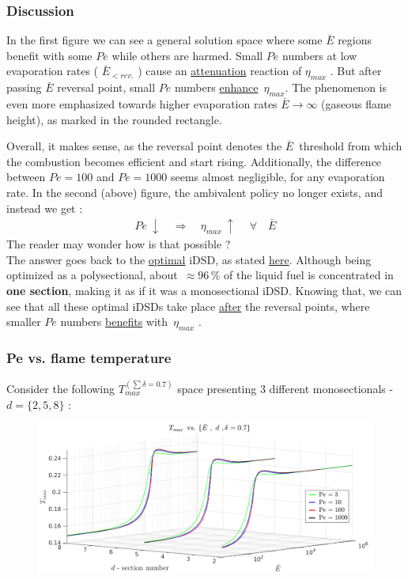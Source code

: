 \documentclass[12pt]{article}
\numberwithin{equation}{section}
\begin{document}
\begin{flushleft}
\subsubsection{Discussion}
In the first figure we can see a general solution space where some $\bar{E}$ regions benefit with some $Pe$ while others are harmed. Small $Pe$ numbers at low evaporation rates ( $\bar{E}_{< rev.}$ ) cause an \underline{attenuation} reaction of $\eta_{max}$ . But after passing $\bar{E}$ reversal point, small $Pe$ numbers \underline{enhance} \,$\eta_{max}$. The phenomenon is even more emphasized towards higher evaporation rates $\bar{E} \rightarrow \infty$ (gaseous flame height), as marked in the rounded rectangle.

Overall, it makes sense, as the reversal point denotes the $\bar{E}$\, threshold from which the combustion becomes efficient and start rising. Additionally, the difference between $Pe = 100$ and $Pe = 1000$ seems almost negligible, for any evaporation rate. In the second (above) figure, the ambivalent policy no longer exists, and instead we get :
\begin{align*}
Pe \ \downarrow \quad \Rightarrow \quad \eta_{max} \ \uparrow \ \quad \forall \quad \bar{E}
\end{align*}
The reader may wonder how is that possible ? \\ \label{opt_question}
The answer goes back to the \underline{optimal} iDSD, as stated \hyperref[eta_Opt]{here}. Although being optimized as a polysectional, about \,$ \approx 96 \, \%$ of the liquid fuel is concentrated in \textbf{one section}, making it as if it was a monosectional iDSD. Knowing that, we can see that all these optimal iDSDs take place \underline{after} the reversal points, where smaller $Pe$ numbers \underline{benefits} with \,$\eta_{max}$ . 

\subsubsection{Pe vs. flame temperature}

Consider the following $T_{max}^{(\sum  \delta=0.7)}$ space presenting 3 different monosectionals - $d = \{2, 5, 8 \}$ :
\begin{figure}[H]
\centering
\includegraphics[width=1.05 \linewidth, center]{T_max_space_low.png}
\end{figure}


\end{flushleft}
\end{document}
